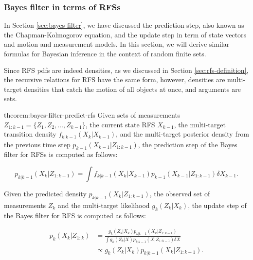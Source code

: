 \subsubsection{Bayes filter in terms of RFSs}\label{sec:bayes-inference-rfs}

In Section \ref{sec:bayes-filter}, we have discussed the prediction step, also known as the Chapman-Kolmogorov equation, and the update step in term of state vectors and motion and measurement models. In this section, we will derive similar formulas for Bayesian inference in the context of random finite sets.

Since RFS pdfs are indeed densities, as we discussed in Section \ref{sec:rfs-definition}, the recursive relations for RFS have the same form, however, densities are multi-target densities that catch the motion of all objects at once, and arguments are sets.

\begin{theorem}{theorem:bayes-filter-predict-rfs}
    Given sets of measurements $Z_{1:k-1} = \{Z_1,\allowbreak Z_2, \ldots, Z_{k-1}\}$, the current state RFS $X_{k-1}$, the multi-target transition density $f_{k|k-1}(X_k | X_{k-1})$, and the multi-target posterior density from the previous time step $p_{k-1}\left({X}_{k-1} | {Z}_{1:k-1}\right)$, the prediction step of the Bayes filter for RFSs is computed as follows:

    \begin{equation}
        p_{k|k-1}\left({X}_k | {Z}_{1:k-1}\right)
        = \int
            f_{k|k-1}\left( {X}_k | {X}_{k-1} \right)
            p_{k-1}\left( {X}_{k-1} | {Z}_{1: k-1} \right)
            \delta {X}_{k-1}.
    \end{equation}
\end{theorem}

\begin{theorem}\label{theorem:bayes-filter-update-rfs}
    Given the predicted density $p_{k|k-1}\left({X}_k | {Z}_{1:k-1}\right)$, the observed set of measurements $Z_k$ and the multi-target likelihood $g_k(Z_k | X_k)$, the update step of the Bayes filter for RFS is computed as follows:
    
    \begin{align}
        p_{k}\left({X}_k | {Z}_{1: k}\right)
        &= \frac{
            g_k\left({Z}_k | {X}_k\right) p_{k|k-1}\left({X}_k | {Z}_{1: k-1}\right)
        }{
            \int g_k\left({Z}_k | X\right) p_{k|k-1}\left(X | {Z}_{1: k-1}\right) \delta X
        } \\
        &\propto g_k\left({Z}_k | {X}_k\right) p_{k|k-1}\left({X}_k | {Z}_{1: k-1}\right).
    \end{align}
\end{theorem}


